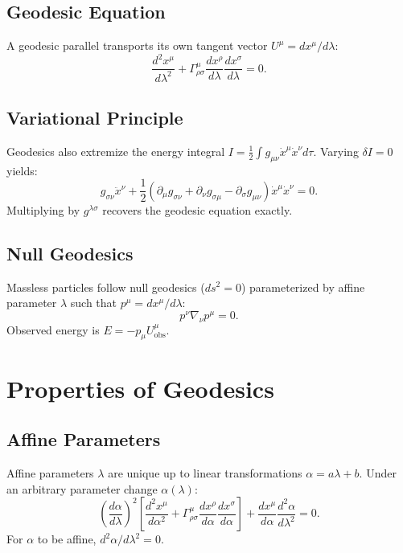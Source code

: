 \documentclass[11pt, a4paper]{report}
\begin{document}
\subsection*{Geodesic Equation}
A geodesic parallel transports its own tangent vector $U^\mu = dx^\mu/d\lambda$:
\begin{equation}\label{eq:geodesic_eq}
\frac{d^2 x^\mu}{d\lambda^2} + \Gamma^\mu_{\rho\sigma} \frac{dx^\rho}{d\lambda} \frac{dx^\sigma}{d\lambda} = 0.
\end{equation}

\subsection*{Variational Principle}
Geodesics also extremize the energy integral $I = \frac{1}{2} \int g_{\mu\nu} \dot{x}^\mu \dot{x}^\nu d\tau$. Varying $\delta I = 0$ yields:
\begin{equation}
g_{\sigma\nu} \ddot{x}^\nu + \frac{1}{2} \left( \partial_\mu g_{\sigma\nu} + \partial_\nu g_{\sigma\mu} - \partial_\sigma g_{\mu\nu} \right) \dot{x}^\mu \dot{x}^\nu = 0.
\end{equation}
Multiplying by $g^{\lambda\sigma}$ recovers the geodesic equation exactly.

\subsection*{Null Geodesics}
Massless particles follow null geodesics ($ds^2 = 0$) parameterized by affine parameter $\lambda$ such that $p^\mu = dx^\mu/d\lambda$:
\begin{equation}
p^\nu \nabla_\nu p^\mu = 0.
\end{equation}
Observed energy is $E = - p_\mu U^\mu_{\text{obs}}$.

\section{Properties of Geodesics}

\subsection*{Affine Parameters}
Affine parameters $\lambda$ are unique up to linear transformations $\alpha = a\lambda + b$. Under an arbitrary parameter change $\alpha(\lambda)$:
\begin{equation}
\left( \frac{d\alpha}{d\lambda} \right)^2 \left[ \frac{d^2 x^\mu}{d\alpha^2} + \Gamma^\mu_{\rho\sigma} \frac{dx^\rho}{d\alpha} \frac{dx^\sigma}{d\alpha} \right] + \frac{dx^\mu}{d\alpha} \frac{d^2\alpha}{d\lambda^2} = 0.
\end{equation}
For $\alpha$ to be affine, $d^2\alpha/d\lambda^2 = 0$.
\end{document}

